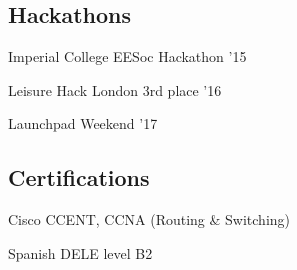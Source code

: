 \documentclass[a4paper]{alex-resume}
\begin{document}
\begin{minipage}[t]{0.38\textwidth}
\subsection{Hackathons}
\vspace{\topsep}
\begin{tightemize}
\item Imperial College EESoc Hackathon '15
\item Leisure Hack London 3rd place '16
\item Launchpad Weekend '17 
\end{tightemize}
\sectionsep

\subsection{Certifications}
\vspace{\topsep}
\begin{tightemize}
\item Cisco CCENT, CCNA (Routing \& Switching)
\item Spanish DELE level B2
\end{tightemize}




\end{minipage}
\hfill
\end{document}
